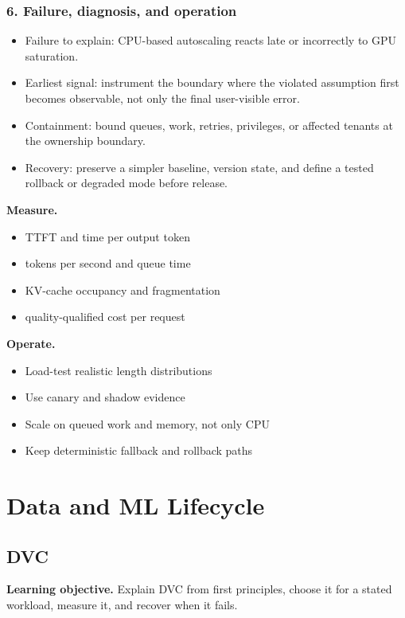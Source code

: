 \subsubsection*{6. Failure, diagnosis, and operation}
\begin{itemize}
\item Failure to explain: CPU-based autoscaling reacts late or incorrectly to GPU saturation.
\item Earliest signal: instrument the boundary where the violated assumption first becomes observable, not only the final user-visible error.
\item Containment: bound queues, work, retries, privileges, or affected tenants at the ownership boundary.
\item Recovery: preserve a simpler baseline, version state, and define a tested rollback or degraded mode before release.
\end{itemize}
\textbf{Measure.}\begin{itemize}
\item TTFT and time per output token
\item tokens per second and queue time
\item KV-cache occupancy and fragmentation
\item quality-qualified cost per request
\end{itemize}
\textbf{Operate.}\begin{itemize}
\item Load-test realistic length distributions
\item Use canary and shadow evidence
\item Scale on queued work and memory, not only CPU
\item Keep deterministic fallback and rollback paths
\end{itemize}
\clearpage\section{Data and ML Lifecycle}
\subsection{DVC}
\textbf{Learning objective.} Explain DVC from first principles, choose it for a stated workload, measure it, and recover when it fails.
